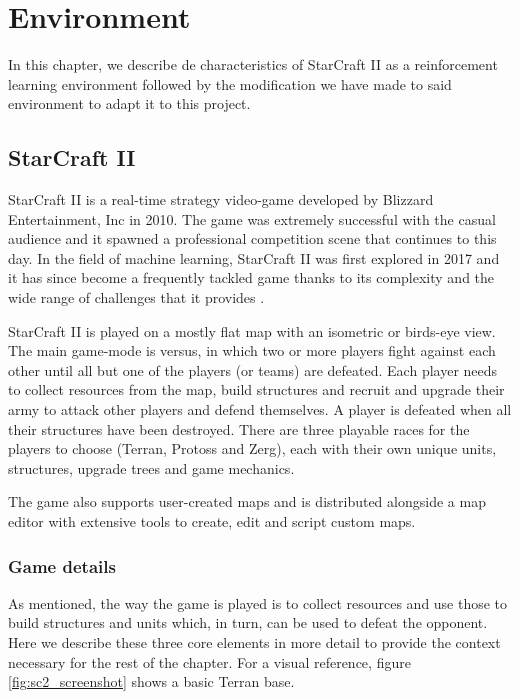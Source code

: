 \chapter{Environment}
\label{chapter:environment}

In this chapter, we describe de characteristics of StarCraft II as a reinforcement learning environment followed by the modification we have made to said environment to adapt it to this project.

\section{StarCraft II}

StarCraft II is a real-time strategy video-game developed by Blizzard Entertainment, Inc in 2010. The game was extremely successful with the casual audience and it spawned a professional competition scene that continues to this day. In the field of machine learning, StarCraft II was first explored in 2017 \cite{Vinyals:2017} and it has since become a frequently tackled game thanks to its complexity and the wide range of challenges that it provides \cite{Tang:2018}.

StarCraft II is played on a mostly flat map with an isometric or birds-eye view. The main game-mode is versus, in which two or more players fight against each other until all but one of the players (or teams) are defeated. Each player needs to collect resources from the map, build structures and recruit and upgrade their army to attack other players and defend themselves. A player is defeated when all their structures have been destroyed. There are three playable races for the players to choose (Terran, Protoss and Zerg), each with their own unique units, structures, upgrade trees and game mechanics.

The game also supports user-created maps and is distributed alongside a map editor with extensive tools to create, edit and script custom maps.

\subsection{Game details}

As mentioned, the way the game is played is to collect resources and use those to build structures and units which, in turn, can be used to defeat the opponent. Here we describe these three core elements in more detail to provide the context necessary for the rest of the chapter. For a visual reference, figure \ref{fig:sc2_screenshot} shows a basic Terran base.

